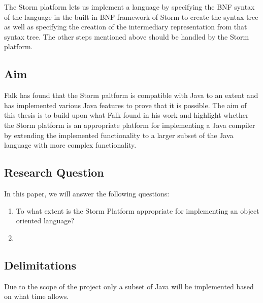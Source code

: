 \documentclass{sigchi}
\begin{document}
The Storm platform lets us implement a language by specifying the BNF syntax of the language in the built-in BNF framework of Storm to create the syntax tree as well as specifying the creation of the intermediary representation from that syntax tree. The other steps mentioned above should be handled by the Storm platform. 

\subsection{Aim}
%

Falk has found that the Storm paltform is compatible with Java to an extent and has implemented various Java features to prove that it is possible\cite{}. The aim of this thesis is to build upon what Falk found in his work and highlight whether the Storm platform is an appropriate platform for implementing a Java compiler by extending the implemented functionality to a larger subset of the Java language with more complex functionality.



\subsection{Research Question}
In this paper, we will answer the following questions:

\begin{enumerate}
\item To what extent is the Storm Platform appropriate for implementing an object oriented language?
\item 
\end{enumerate}

\subsection{Delimitations}
Due to the scope of the project only a subset of Java will be implemented based on what time allows.
\end{document}

